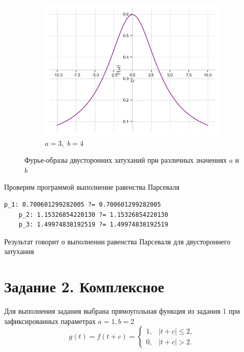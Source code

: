 \documentclass[a4paper, 16pt]{article}
\begin{document}
\begin{figure}[htbp]
\begin{subfigure}{0.3\textwidth}
            \centering
            \includegraphics[width=\linewidth]{doatfimg_a=3_b=4.png}
            \caption{$a=3,\,\,b=4$}
            \label{fig:doatfimg_3}
        \end{subfigure}
        \caption{Фурье-образы двусторонних затуханий при различных значениях $a$ и $b$}
        \label{fig:doatfimgs}
    \end{figure}


    \noindent Проверим программой выполнение равенства Парсеваля
    \begin{lstlisting}[label=pars_doat, caption=Равенство Парсеваля для функции Гаусса]
    p_1: 0.700601299282005 ?= 0.700601299282005
    p_2: 1.15326854220130 ?= 1.15326854220130
    p_3: 1.49974838192519 ?= 1.49974838192519
    \end{lstlisting}


    \noindent Результат говорит о выполнении равенства Парсеваля для двустороннего затухания




    \section{Задание 2. Комплексное}
    \noindent Для выполнения задания выбрана прямоугольная функция из задания 1 при зафиксированных
    параметрах $a=1,b=2$
    $$
    g(t)=f(t+c)=
    \begin{cases}
        1, & \left|t+c\right|\leq 2,\\
        0, & \left|t+c\right|>2.
    \end{cases}
    $$
\end{document}
